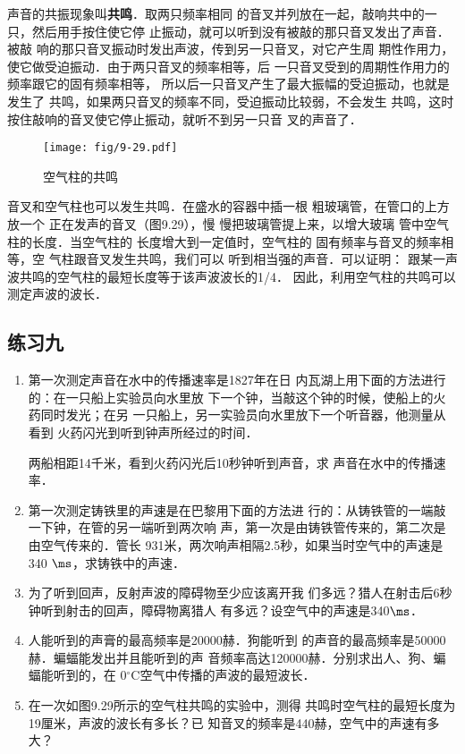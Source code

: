 声音的共振现象叫\textbf{共鸣}．取两只频率相同
的音叉并列放在一起，敲响共中的一只，然后用手按住使它停
止振动，就可以听到没有被敲的那只音叉发出了声音．被敲
响的那只音叉振动时发出声波，传到另一只音叉，对它产生周
期性作用力，使它做受迫振动．由于两只音叉的频率相等，后
一只音叉受到的周期性作用力的频率跟它的固有频率相等，
所以后一只音叉产生了最大振幅的受迫振动，也就是发生了
共鸣，如果两只音叉的频率不同，受迫振动比较弱，不会发生
共鸣，这时按住敲响的音叉使它停止振动，就听不到另一只音
叉的声音了．
\begin{figure}[htp]\centering
    \texttt{[image: fig/9-29.pdf]}
    \caption{空气柱的共鸣}
    \end{figure}

音叉和空气柱也可以发生共鸣．在盛水的容器中插一根
粗玻璃管，在管口的上方放一个
正在发声的音叉（图9.29），慢
慢把玻璃管提上来，以增大玻璃
管中空气柱的长度．当空气柱的
长度增大到一定值时，空气柱的
固有频率与音叉的频率相等，空
气柱跟音叉发生共鸣，我们可以
听到相当强的声音．可以证明：
跟某一声波共鸣的空气柱的最短长度等于该声波波长的1/4．
因此，利用空气柱的共鸣可以测定声波的波长．


\subsection*{练习九}

\begin{enumerate}
\item 第一次测定声音在水中的传播速率是1827年在日
内瓦湖上用下面的方法进行的：在一只船上实验员向水里放
下一个钟，当敲这个钟的时候，使船上的火药同时发光；在另
一只船上，另一实验员向水里放下一个听音器，他测量从看到
火药闪光到听到钟声所经过的时间．

两船相距14千米，看到火药闪光后10秒钟听到声音，求
声音在水中的传播速率．

\item 第一次测定铸铁里的声速是在巴黎用下面的方法进
行的：从铸铁管的一端敲一下钟，在管的另一端听到两次响
声，第一次是由铸铁管传来的，第二次是由空气传来的．管长
931米，两次响声相隔2.5秒，如果当时空气中的声速是340
$\ms$，求铸铁中的声速．

\item 为了听到回声，反射声波的障碍物至少应该离开我
们多远？猎人在射击后6秒钟听到射击的回声，障碍物离猎人
有多远？设空气中的声速是340$\ms$．
\item 人能听到的声膏的最高频率是20000赫．狗能听到
的声音的最高频率是50000赫．蝙蝠能发出并且能听到的声
音频率高达120000赫．分别求出人、狗、蝙蝠能听到的，在
0$^{\circ}$C空气中传播的声波的最短波长．
\item 在一次如图9.29所示的空气柱共鸣的实验中，测得
共鸣时空气柱的最短长度为19厘米，声波的波长有多长？已
知音叉的频率是440赫，空气中的声速有多大？


\end{enumerate}

